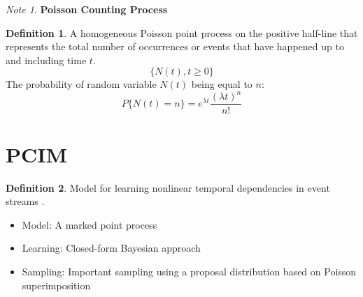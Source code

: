 \documentclass[12pt]{article}
\theoremstyle{plain}
\theoremstyle{definition}
\newtheorem{definition}{Definition}
\theoremstyle{remark}
\newtheorem*{note}{Note}
\begin{document}
\begin{note}

  \textbf{Poisson Counting Process}

\begin{definition}
  A homogeneous Poisson point process on the positive half-line that represents
  the total number of occurrences or events that have happened up to and
  including time $t$.
  \begin{equation*}
    \{ N(t), t \geq 0 \}
  \end{equation*}
  The probability of random variable $N(t)$ being equal to $n$:
  \begin{equation*}
    P\{N(t)=n\} = e^{\lambda t} \frac{(\lambda t)^n}{n!}
  \end{equation*}
\end{definition}

\end{note}

\section{PCIM}

\begin{definition}
  Model for learning nonlinear temporal dependencies in event streams
  \citep{gunmeexu11}.

\begin{itemize}
  \item Model: A marked point process
  \item Learning: Closed-form Bayesian approach
  \item Sampling: Important sampling using a proposal distribution based on
    Poisson superimposition
\end{itemize}

\end{definition}



\end{document}
